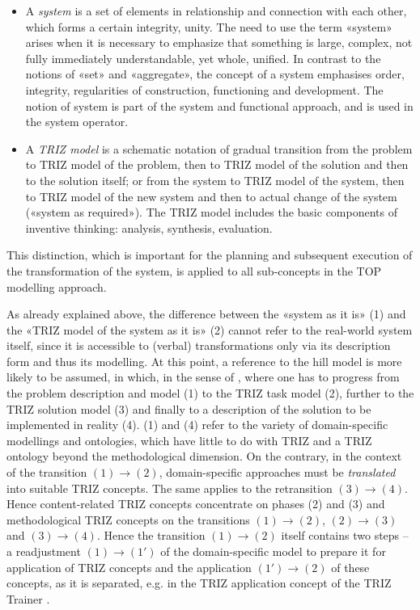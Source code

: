 \documentclass[11pt,a4paper]{article}
\begin{document}
\begin{itemize}[noitemsep]
\item A \emph{system} is a set of elements in relationship and connection with
  each other, which forms a certain integrity, unity. The need to use the term
  «system» arises when it is necessary to emphasize that something is large,
  complex, not fully immediately understandable, yet whole, unified. In
  contrast to the notions of «set» and «aggregate», the concept of a system
  emphasises order, integrity, regularities of construction, functioning and
  development. The notion of system is part of the system and functional
  approach, and is used in the system operator.
\item A \emph{TRIZ model} is a schematic notation of gradual transition
  from the problem to TRIZ model of the problem, then to TRIZ model of the
  solution and then to the solution itself; or from the system to TRIZ model
  of the system, then to TRIZ model of the new system and then to actual
  change of the system («system as required»). The TRIZ model includes the
  basic components of inventive thinking: analysis, synthesis, evaluation.
\end{itemize}
This distinction, which is important for the planning and subsequent execution
of the transformation of the system, is applied to all sub-concepts in the TOP
modelling approach.  

As already explained above, the difference between the «system as it is» (1)
and the «TRIZ model of the system as it is» (2) cannot refer to the real-world
system itself, since it is accessible to (verbal) transformations only via its
description form and thus its modelling. At this point, a reference to the
hill model is more likely to be assumed, in which, in the sense of \cite{TT},
where one has to progress from the problem description and model (1) to the
TRIZ task model (2), further to the TRIZ solution model (3) and finally to a
description of the solution to be implemented in reality (4). (1) and (4)
refer to the variety of domain-specific modellings and ontologies, which have
little to do with TRIZ and a TRIZ ontology beyond the methodological
dimension.  On the contrary, in the context of the transition $(1) \to (2)$,
domain-specific approaches must be \emph{translated} into suitable TRIZ
concepts.  The same applies to the retransition $(3) \to (4)$. Hence
content-related TRIZ concepts concentrate on phases (2) and (3) and
methodological TRIZ concepts on the transitions $(1) \to (2)$, $(2) \to (3)$
and $(3) \to (4)$. Hence the transition $(1) \to (2)$ itself contains two
steps -- a readjustment $(1) \to (1')$ of the domain-specific model to prepare
it for application of TRIZ concepts and the application $(1') \to (2)$ of
these concepts, as it is separated, e.g. in the TRIZ application concept of
the TRIZ Trainer \cite{TT}. 
\end{document}

